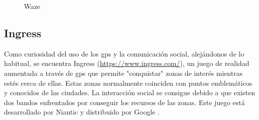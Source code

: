 \begin{figure}[h!btp]
	\begin{adjustbox}{minipage=\linewidth, fbox}
		\centering
		\hspace{10mm}
	\end{adjustbox}
\caption{Waze}
	\label{fig:waze}
\end{figure}

\subsection{Ingress}

Como curiosidad del uso de los gps y la comunicación social, alejándonos de lo habitual, se encuentra Ingress (\url{https://www.ingress.com/}), un juego de realidad aumentada a través de gps que permite "conquistar" zonas de interés mientras estés cerca de ellas. Estas zonas normalmente coinciden con puntos emblemáticos y conocidos de las ciudades. La interacción social se consigue debido a que existen dos bandos enfrentados por conseguir los recursos de las zonas. Este juego está desarrollado por Niantic y distribuido por Google \cite{Pen13}.


